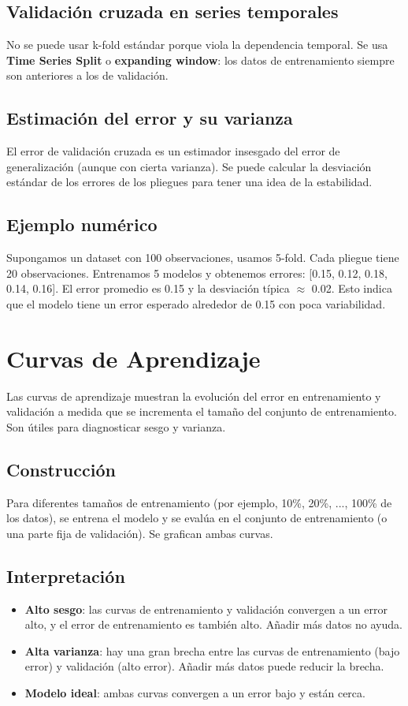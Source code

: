 \documentclass[12pt,a4paper,openany,oneside]{book}
\begin{document}
\subsection{Validación cruzada en series temporales}
No se puede usar k-fold estándar porque viola la dependencia temporal. Se usa \textbf{Time Series Split} o \textbf{expanding window}: los datos de entrenamiento siempre son anteriores a los de validación.

\subsection{Estimación del error y su varianza}
El error de validación cruzada es un estimador insesgado del error de generalización (aunque con cierta varianza). Se puede calcular la desviación estándar de los errores de los pliegues para tener una idea de la estabilidad.

\subsection{Ejemplo numérico}
Supongamos un dataset con 100 observaciones, usamos 5-fold. Cada pliegue tiene 20 observaciones. Entrenamos 5 modelos y obtenemos errores: [0.15, 0.12, 0.18, 0.14, 0.16]. El error promedio es 0.15 y la desviación típica $\approx$ 0.02. Esto indica que el modelo tiene un error esperado alrededor de 0.15 con poca variabilidad.

\section{Curvas de Aprendizaje}

Las curvas de aprendizaje muestran la evolución del error en entrenamiento y validación a medida que se incrementa el tamaño del conjunto de entrenamiento. Son útiles para diagnosticar sesgo y varianza.

\subsection{Construcción}
Para diferentes tamaños de entrenamiento (por ejemplo, 10\%, 20\%, ..., 100\% de los datos), se entrena el modelo y se evalúa en el conjunto de entrenamiento (o una parte fija de validación). Se grafican ambas curvas.

\subsection{Interpretación}
\begin{itemize}
    \item \textbf{Alto sesgo}: las curvas de entrenamiento y validación convergen a un error alto, y el error de entrenamiento es también alto. Añadir más datos no ayuda.
    \item \textbf{Alta varianza}: hay una gran brecha entre las curvas de entrenamiento (bajo error) y validación (alto error). Añadir más datos puede reducir la brecha.
    \item \textbf{Modelo ideal}: ambas curvas convergen a un error bajo y están cerca.
\end{itemize}
\end{document}
